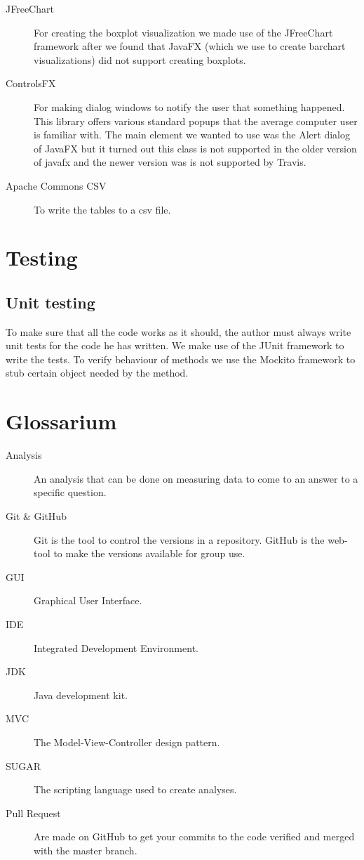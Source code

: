 \documentclass[a4paper]{article}
\begin{document}
\begin{description}
\item[JFreeChart] For creating the boxplot visualization we made use of the JFreeChart framework
after we found that JavaFX (which we use to create barchart visualizations) did not support creating boxplots.

\item[ControlsFX] For making dialog windows to notify the user that something happened.
This library offers various standard popups that the average computer user is familiar with.
The main element we wanted to use was the Alert dialog of JavaFX but it turned out this class 
is not supported in the older version of javafx and the newer version was is not supported by Travis.

\item[Apache Commons CSV] To write the tables to a csv file.


\end{description}

\section{Testing}
\subsection{Unit testing}
To make sure that all the code works as it should, the author must always write
unit tests for the code he has written. We make use of the JUnit framework to
write the tests. To verify behaviour of methods we use the Mockito framework to
stub certain object needed by the method.

\section{Glossarium}

\begin{description}

\item[Analysis] An analysis that can be done on measuring data to come to an answer to a specific question.
\item[Git \& GitHub] Git is the tool to control the versions in a repository. GitHub is the web-tool to make the versions available for group use.
\item[GUI] Graphical User Interface.
\item[IDE] Integrated Development Environment.
\item[JDK] Java development kit.
\item[MVC] The Model-View-Controller design pattern.
\item[SUGAR] The scripting language used to create analyses.
\item[Pull Request] Are made on GitHub to get your commits to the code verified and merged with the master branch.

\end{description}
\end{document}
